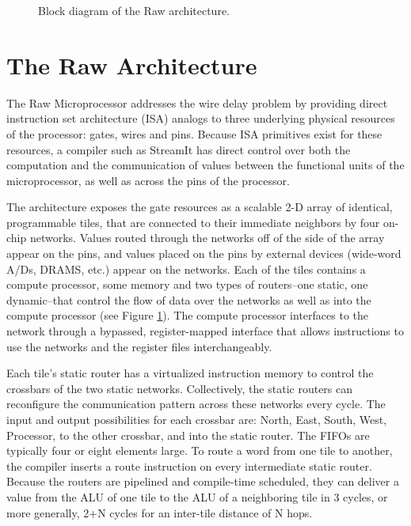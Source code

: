 
\begin{figure}
\begin{minipage}{3in}
\centering
{}
\caption{Block diagram of the Raw architecture.
\protect\label{fig:raw-diagram}}
\end{minipage}
\end{figure}

\section{The Raw Architecture}
\label{sec:raw}

The Raw Microprocessor \cite{raw10,raw} addresses the wire delay
problem \cite{raw13} by providing direct instruction set architecture
(ISA) analogs to three underlying physical resources of the processor:
gates, wires and pins. Because ISA primitives exist for these
resources, a compiler such as StreamIt has direct control over both
the computation and the communication of values between the functional
units of the microprocessor, as well as across the pins of the
processor.

The architecture exposes the gate resources as a scalable 2-D array of
identical, programmable tiles, that are connected to their immediate
neighbors by four on-chip networks.  Values routed through the
networks off of the side of the array appear on the pins, and values
placed on the pins by external devices (wide-word A/Ds, DRAMS, etc.)
appear on the networks.  Each of the tiles contains a compute
processor, some memory and two types of routers--one static, one
dynamic--that control the flow of data over the networks as well as
into the compute processor (see Figure \ref{fig:raw-diagram}).  The
compute processor interfaces to the network through a bypassed,
register-mapped interface \cite{raw10} that allows instructions to use
the networks and the register files interchangeably.

Each tile's static router has a virtualized instruction memory to
control the crossbars of the two static networks. Collectively, the
static routers can reconfigure the communication pattern across these
networks every cycle.  The input and output possibilities for each
crossbar are: North, East, South, West, Processor, to the other
crossbar, and into the static router. The FIFOs are typically four or
eight elements large.  To route a word from one tile to another, the
compiler inserts a route instruction on every intermediate static
router.  Because the routers are pipelined and compile-time scheduled,
they can deliver a value from the ALU of one tile to the ALU of a
neighboring tile in 3 cycles, or more generally, 2+N cycles for an
inter-tile distance of N hops.


